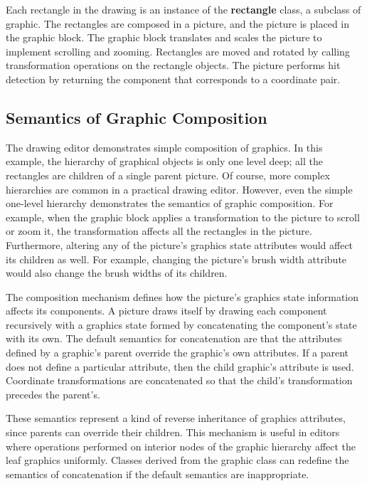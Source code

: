 Each rectangle in the drawing is an instance of the {\bf rectangle}
class, a subclass of graphic.  The rectangles are composed in a
picture, and the picture is placed in the graphic block.  The graphic
block translates and scales the picture to implement scrolling and
zooming.  Rectangles are moved and rotated by calling transformation
operations on the rectangle
objects.  The picture performs hit detection by returning the
component that corresponds to a coordinate pair.

    \subsection{Semantics of Graphic \newline Composition}

The drawing editor demonstrates simple composition of graphics.  In
this example, the
hierarchy of graphical objects is only one level deep; all the
rectangles are children of a single parent picture.  Of course, more
complex hierarchies are common in a practical drawing editor.
However, even the simple one-level hierarchy demonstrates the
semantics of graphic composition.  For example, when the graphic block
applies a transformation to the picture to scroll or zoom it,
the transformation affects all the rectangles in the picture.
Furthermore, altering any of the picture's graphics state attributes
would affect its children as well.  For example, changing the
picture's brush width attribute would also change
the brush widths of its children.

The composition mechanism defines how the picture's graphics state
information affects its components.  A picture draws itself
by drawing each
component recursively with a graphics state formed by concatenating the
component's state with its own.  The default semantics for concatenation 
are that the attributes defined by a
graphic's parent override the graphic's own attributes.  If a parent does
not define a particular attribute, then the child graphic's attribute is
used.  Coordinate transformations are concatenated so that the child's
transformation precedes the parent's.

These semantics represent a kind of reverse inheritance of graphics
attributes, since parents can override their children.  This mechanism
is useful in editors where operations performed on interior nodes of
the graphic hierarchy affect the leaf graphics uniformly.  Classes
derived from the graphic class can redefine the semantics of
concatenation if the default semantics are inappropriate.

